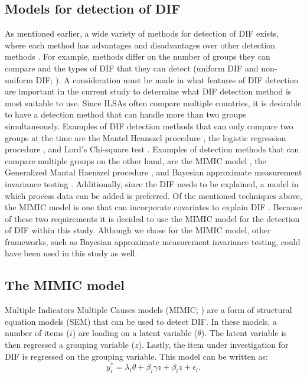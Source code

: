 \documentclass{interact}
\begin{document}
\subsection{Models for detection of DIF}
As mentioned earlier, a wide variety of methods for detection of DIF exists, where each method has advantages and disadvantages over other detection methods \parencite{gao2019comparison}. For example, methods differ on the number of groups they can compare and the types of DIF that they can detect (uniform DIF and non-uniform DIF; \cite{mellenbergh1983conditional}). A consideration must be made in what features of DIF detection are important in the current study to determine what DIF detection method is most suitable to use. Since ILSAs often compare multiple countries, it is desirable to have a detection method that can handle more than two groups simultaneously. Examples of DIF detection methods that can only compare two groups at the time are the Mantel Heanszel procedure \parencite{mantel1959statistical}, the logistic regression procedure \parencite{swaminathan1990detecting}, and Lord's Chi-square test \parencite{lord1977study, lord1980study}. Examples of detection methods that can compare multiple groups on the other hand, are the MIMIC model \parencite{joreskog1975estimation}, the Generalized Mantal Haenszel procedure \parencite{landis1978average, penfield2001assessing}, and Bayesian approximate measurement invariance testing \parencite{muthen2013bsem, van2013facing}. Additionally, since the DIF needs to be explained, a model in which process data can be added is preferred. Of the mentioned techniques above, the MIMIC model is one that can incorporate covariates to explain DIF \parencite{woods2009evaluation, chun2014using}. Because of these two requirements it is decided to use the MIMIC model for the detection of DIF within this study. Although we chose for the MIMIC model, other frameworks, such as Bayesian approximate measurement invariance testing, could have been used in this study as well.

\subsection{The MIMIC model}
Multiple Indicators Multiple Causes models (MIMIC; \cite{joreskog1975estimation}) are a form of structural equation models (SEM) that can be used to detect DIF. In these models, a number of items ($i$) are loading on a latent variable ($\theta$). The latent variable is then regressed a grouping variable ($z$). Lastly, the item under investigation for DIF is regressed on the grouping variable. This model can be written as:
\begin{equation}
    y^*_i = \lambda_i \theta + \beta_i\gamma z + \beta_i z + \epsilon_i.
\end{equation}
    
\end{document}
